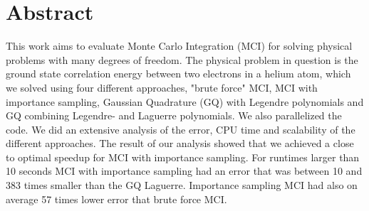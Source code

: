\section*{Abstract}
This work aims to evaluate Monte Carlo Integration (MCI) for solving physical
problems with many degrees of freedom. The physical problem in question is
the ground state correlation energy between two electrons in a helium atom,
which we solved using four different approaches, "brute force" MCI, MCI with
importance sampling, Gaussian Quadrature (GQ) with Legendre polynomials and GQ
combining Legendre- and Laguerre polynomials. We also parallelized the code.
We did an extensive analysis of the error,
CPU time and scalability of the different approaches. The result of our
analysis showed that we achieved a close to optimal speedup for MCI with
importance sampling. For runtimes larger than 10 seconds MCI with importance
sampling had an error that was between 10 and 383 times smaller than the
GQ Laguerre. Importance sampling MCI had also on average 57 times lower error
that brute force MCI. 
